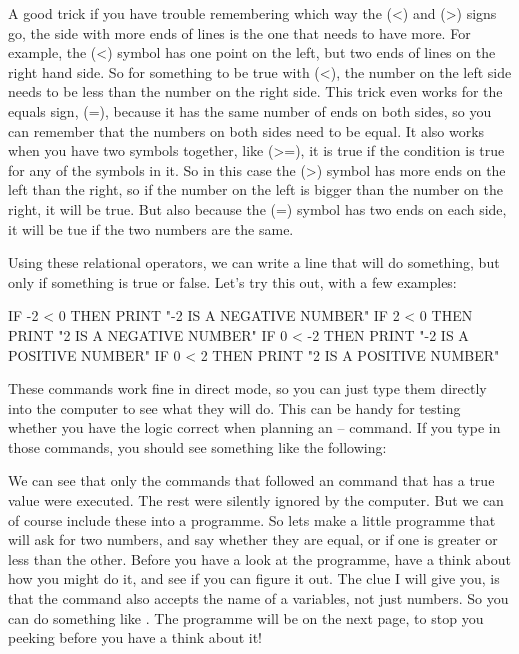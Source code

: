 A good trick if you have trouble remembering which way the \stw(<) and \stw(>)
signs go, the side with more ends of lines is the one that needs to
have more. For example, the \stw(<) symbol has one point on the left, but
two ends of lines on the right hand side.  So for something to be true
with \stw(<), the number on the left side needs to be less than the number
on the right side.  This trick even works for the equals sign, \stw(=),
because it has the same number of ends on both sides, so you can
remember that the numbers on both sides need to be equal.  It also
works when you have two symbols together, like \stw(>=), it is true if
the condition is true for any of the symbols in it. So in this case
the \stw(>) symbol has more ends on the left than the right, so if the
number on the left is bigger than the number on the right, it will be
true. But also because the \stw(=) symbol has two ends on each side,
it will be tue if the two numbers are the same.

\needspace{2cm}
Using these relational operators, we can write a line that will do
something, but only if something is true or false.  Let's try this
out, with a few examples:

\begin{screenoutput}
  IF -2 < 0 THEN PRINT "-2 IS A NEGATIVE NUMBER"
  IF 2 < 0 THEN PRINT "2 IS A NEGATIVE NUMBER"
  IF 0 < -2 THEN PRINT "-2 IS A POSITIVE NUMBER"
  IF 0 < 2 THEN PRINT "2 IS A POSITIVE NUMBER"
\end{screenoutput}

\needspace{4cm}
These commands work fine in direct mode, so you can just type them
directly into the computer to see what they will do.  This can be
handy for testing whether you have the logic correct when planning an
 --  command.  If you type in those commands, you
should see something like the following:


We can see that only the  commands that followed an
 command that has a true value were executed. The rest
were silently ignored by the computer.  But we can of course include
these into a programme. So lets make a little programme that will ask
for two numbers, and say whether they are equal, or if one is greater
or less than the other.  Before you have a look at the programme, have
a think about how you might do it, and see if you can figure it out.
The clue I will give you, is that the  command also accepts the name of
a variables, not just numbers. So you can do something like . The programme will be on the next page, to stop you peeking before you
have a think about it!

